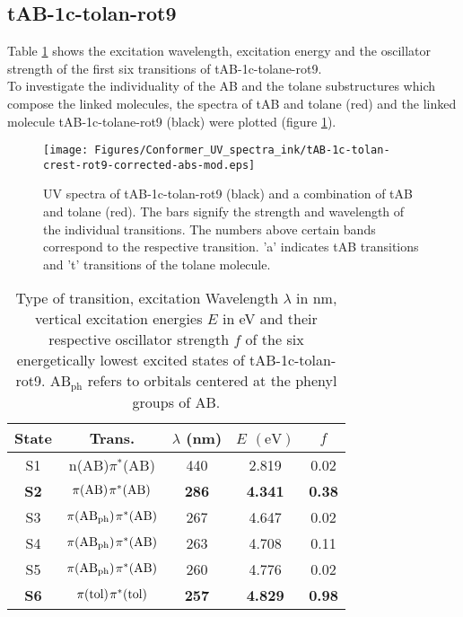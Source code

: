 \subsection{tAB-1c-tolan-rot9}
%
Table \ref{tab:excited_states_tAB_1c_tolan} shows the excitation wavelength, excitation energy and the oscillator strength of the first six transitions of tAB-1c-tolane-rot9. \\
To investigate the individuality of the AB and the tolane substructures which compose the linked molecules, the spectra of tAB and tolane (red) and the linked molecule tAB-1c-tolane-rot9 (black) were plotted (figure \ref{fig:UV_spec_tAB-1c-tolan}).
%
%
\begin{figure}[H]
    \centering
    \texttt{[image: Figures/Conformer\_UV\_spectra\_ink/tAB-1c-tolan-crest-rot9-corrected-abs-mod.eps]}
    \caption{UV spectra of tAB-1c-tolan-rot9 (black) and a combination of tAB and tolane (red). The bars signify the strength and wavelength of the individual transitions. The numbers above certain bands correspond to the respective transition. 'a' indicates tAB transitions and 't' transitions of the tolane molecule.}
    \label{fig:UV_spec_tAB-1c-tolan}
\end{figure}
%
\begin{table}[ht]
  \caption{Type of transition, excitation Wavelength $\lambda$ in nm, vertical excitation energies $E$ in eV and their respective oscillator strength $f$ of the six energetically lowest excited states of tAB-1c-tolan-rot9. $\mathrm{AB_{ph}}$ refers to orbitals centered at the phenyl groups of AB.}
  \label{tab:excited_states_tAB_1c_tolan}
  \vspace{0.1 cm}
  \centering
  \begin{tabular}{ccccc}
  \toprule
  State & Trans. & $\lambda$ (nm)     & $E$ $\left(\si{\eV}\right)$          & $f$                 \\ \midrule
  S1 & n(AB)$\pi^{*}$(AB)  & 440   & 2.819 & 0.02                \\
  \textbf{S2}    & $\pi\mathrm{(AB)}\hspace{1 pt} \pi^{*}\mathrm{(AB)}$   & \textbf{286} & \textbf{4.341} & \textbf{0.38} \\
  S3    & $\pi\mathrm{(AB_{ph})}\hspace{1 pt} \pi^{*}\mathrm{(AB)}$& 267 & 4.647 & 0.02                \\
  S4    & $\pi\mathrm{(AB_{ph})} \hspace{1 pt} \pi^{*}\mathrm{(AB)}$& 263 & 4.708 & 0.11                \\
  S5    & $\pi\mathrm{(AB_{ph})} \hspace{1 pt} \pi^{*}\mathrm{(AB)}$& 260 & 4.776 & 0.02                \\
  \textbf{S6} & $\pi\mathrm{(tol)} \hspace{1 pt} \pi^{*}\mathrm{(tol)}$& \textbf{257} & \textbf{4.829} & \textbf{0.98}       \\ \bottomrule
  \end{tabular}
  \end{table}
